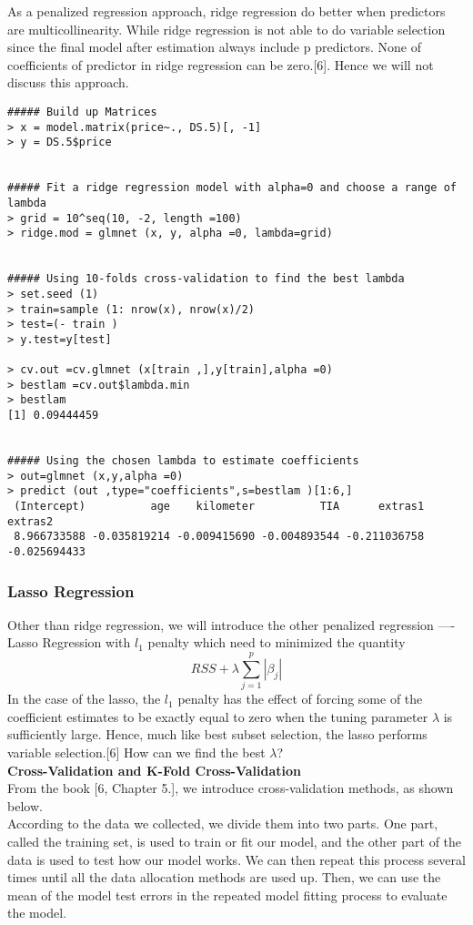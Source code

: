 \documentclass[a4paper]{article}
\begin{document}
\noindent
As a penalized regression approach, ridge regression do better when predictors are multicollinearity. While ridge regression is not able to do variable selection since the final model after estimation always include p predictors. None of coefficients of predictor in ridge regression can be zero.[6]. Hence we will not discuss this approach.



\begin{verbatim}
##### Build up Matrices
> x = model.matrix(price~., DS.5)[, -1]
> y = DS.5$price


##### Fit a ridge regression model with alpha=0 and choose a range of lambda
> grid = 10^seq(10, -2, length =100)
> ridge.mod = glmnet (x, y, alpha =0, lambda=grid)


##### Using 10-folds cross-validation to find the best lambda 
> set.seed (1)
> train=sample (1: nrow(x), nrow(x)/2)
> test=(- train )
> y.test=y[test]

> cv.out =cv.glmnet (x[train ,],y[train],alpha =0)
> bestlam =cv.out$lambda.min
> bestlam
[1] 0.09444459


##### Using the chosen lambda to estimate coefficients
> out=glmnet (x,y,alpha =0)
> predict (out ,type="coefficients",s=bestlam )[1:6,]
 (Intercept)          age    kilometer          TIA      extras1      extras2 
 8.966733588 -0.035819214 -0.009415690 -0.004893544 -0.211036758 -0.025694433 
\end{verbatim}









\subsubsection{Lasso Regression}
Other than ridge regression, we will introduce the other penalized regression ---- Lasso Regression with $\textit{l}_1$ penalty which need to minimized the quantity \[RSS + \lambda \sum_{j=1}^{p}|\beta_j|\] In the case of the lasso, the $\textit{l}_1$ penalty has the effect of forcing some of the coefficient estimates to be exactly equal to zero when the tuning parameter $\lambda$ is sufficiently large. Hence, much like best subset selection, the lasso performs variable selection.[6] How can we find the best $\lambda$?\\

\noindent
\textbf{Cross-Validation and K-Fold Cross-Validation}\\
From the book [6, Chapter 5.], we introduce cross-validation methods, as shown below.\\
According to the data we collected, we divide them into two parts. One part, called the training set, is used to train or fit our model, and the other part of the data is used to test how our model works. We can then repeat this process several times until all the data allocation methods are used up. Then, we can use the mean of the model test errors in the repeated model fitting process to evaluate the model.\\
\end{document}
